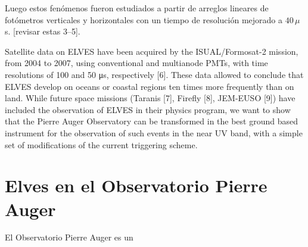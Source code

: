 \documentclass[12pt,oneside,openany,letter]{book}
\begin{document}
Luego estos fenómenos fueron estudiados a partir de arreglos lineares de fotómetros verticales y horizontales con un tiempo de resolución mejorado a $40\,\mu$s. [revisar estas 3–5]. 

Satellite data on ELVES have been acquired by the ISUAL/Formosat-2 mission, from 2004 to
2007, using conventional and multianode PMTs, with time resolutions of 100 and 50 μs, respectively [6]. These data allowed to conclude that ELVES develop on oceans or coastal regions ten times more frequently than on land. 
While future space missions (Taranis [7], Firefly [8], JEM-EUSO [9]) have included the observation of ELVES in their physics program, we want to show that the Pierre Auger Observatory can be transformed in the best ground based instrument for the observation of such events in the near UV band, with a simple set of modifications of the current triggering
scheme.


\section{Elves en el Observatorio Pierre Auger}

El Observatorio Pierre Auger es un 


\end{document}
